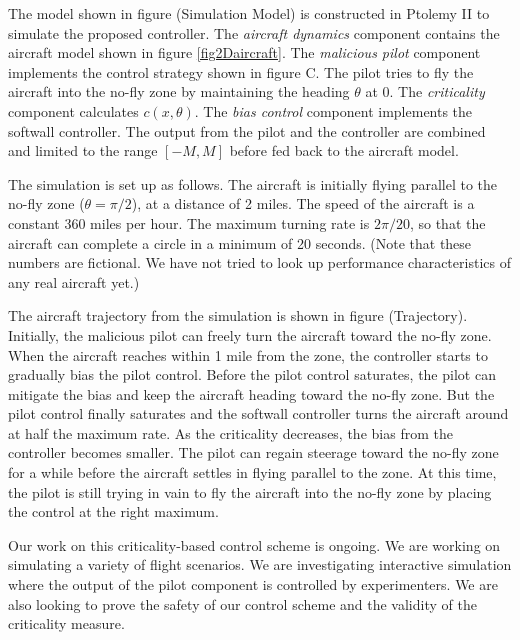 \documentclass[11pt]{article}
\begin{document}
The model shown in figure (Simulation Model) is constructed in Ptolemy II to
simulate the proposed controller. The \emph{aircraft dynamics} component
contains the
aircraft model shown in figure \ref{fig2Daircraft}. The \emph{malicious pilot}
component implements the control strategy shown in figure C. The pilot tries
to fly the aircraft into the no-fly zone by maintaining the heading $\theta$
at 0. The \emph{criticality} component calculates $c(x, \theta)$. The
\emph{bias control} component implements the softwall controller. The output
from the pilot and the controller are combined and limited to the range
$[-M, M]$ before fed back to the aircraft model.

The simulation is set up as follows. The aircraft is initially flying parallel
to the no-fly zone ($\theta = \pi / 2$), at a distance of 2 miles. The speed of
the aircraft is a constant 360 miles per hour. The maximum turning rate is 
$2\pi/20$, so that the aircraft can complete a circle in a minimum of 20
seconds. (Note that these numbers are fictional. We have not tried to look up
performance characteristics of any real aircraft yet.)

The aircraft trajectory from the simulation is shown in figure (Trajectory).
Initially, the malicious pilot can freely turn the aircraft toward the no-fly
zone. When the aircraft reaches within 1 mile from the zone, the controller
starts to gradually bias the pilot control. Before the pilot control saturates,
the pilot can mitigate the bias and keep the aircraft heading toward the no-fly
zone. But the pilot control finally saturates and the softwall controller 
turns the aircraft around at half the maximum rate. As the criticality
decreases, the bias from the controller becomes smaller. The pilot can regain
steerage toward the no-fly zone for a while before the aircraft settles in
flying parallel to the zone. At this time, the pilot is still trying in vain
to fly the aircraft into the no-fly zone by placing the control at the right
maximum.

Our work on this criticality-based control scheme is ongoing. We are working on
simulating a variety of flight scenarios. We are investigating interactive
simulation where the output of the pilot component is controlled by 
experimenters. We are also looking to prove the safety of our control scheme
and the validity of the criticality measure.
\end{document}
